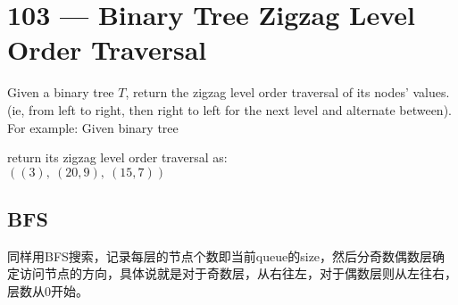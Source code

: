 \section{103 --- Binary Tree Zigzag Level Order Traversal}
Given a binary tree $T$, return the zigzag level order traversal of its nodes' values. (ie, from left to right, then right to left for the next level and alternate between). For example: Given binary tree
\begin{figure}[H]
\end{figure}
return its zigzag level order traversal as:
\\
$\left((3),\ (20,9),\ (15,7)\right)$
\subsection{BFS}
\begin{CJK*}{UTF8}{gbsn}
同样用BFS搜索，记录每层的节点个数即当前queue的size，然后分奇数偶数层确定访问节点的方向，具体说就是对于奇数层，从右往左，对于偶数层则从左往右，层数从0开始。
\end{CJK*}